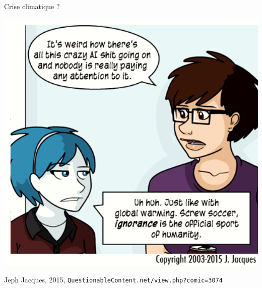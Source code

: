 \documentclass[11pt,french,ignorenonframetext,]{beamer}
\begin{document}
\begin{frame}[plain]{Crise climatique ?}

  \begin{center}
    \includegraphics[height=0.85\textheight]{../common/TalkAboutGlobalWarmingNow.png}

      \begin{tiny}
        \textcopyright{} Jeph Jacques, 2015,
        \texttt{QuestionableContent.net/view.php?comic=3074}
      \end{tiny}
  \end{center}

\end{frame}
\end{document}
